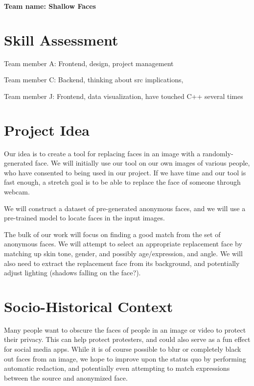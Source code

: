 
\textbf{Team name: Shallow Faces}

\section*{Skill Assessment}


Team member A: Frontend, design, project management

Team member C: Backend, thinking about src implications,

Team member J: Frontend, data visualization, have touched C++ several times


\section*{Project Idea}

Our idea is to create a tool for replacing faces in an image with a randomly-generated face. We will initially use our tool on our own images of various people, who have consented to being used in our project. If we have time and our tool is fast enough, a stretch goal is to be able to replace the face of someone through webcam.

We will construct a dataset of pre-generated anonymous faces, and we will use a pre-trained model to locate faces in the input images.

The bulk of our work will focus on finding a good match from the set of anonymous faces. We will attempt to select an appropriate replacement face by matching up skin tone, gender, and possibly age/expression, and angle. We will also need to extract the replacement face from its background, and potentially adjust lighting (shadows falling on the face?).

\section*{Socio-Historical Context}

Many people want to obscure the faces of people in an image or video to protect their privacy. This can help protect protesters, and could also serve as a fun effect for social media apps. While it is of course possible to blur or completely black out faces from an image, we hope to improve upon the status quo by performing automatic redaction, and potentially even attempting to match expressions between the source and anonymized face.

